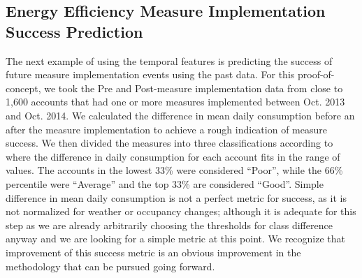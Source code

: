 \subsection{Energy Efficiency Measure Implementation Success Prediction}
\label{sec:measuresuccess}

The next example of using the temporal features is predicting the success of future measure implementation events using the past data. For this proof-of-concept, we took the Pre and Post-measure implementation data from close to 1,600 accounts that had one or more measures implemented between Oct. 2013 and Oct. 2014. We calculated the difference in mean daily consumption before an after the measure implementation to achieve a rough indication of measure success. We then divided the measures into three classifications according to where the difference in daily consumption for each account fits in the range of values. The accounts in the lowest 33\% were considered “Poor”, while the 66\% percentile were “Average” and the top 33\% are considered “Good”. Simple difference in mean daily consumption is not a perfect metric for success, as it is not normalized for weather or occupancy changes; although it is adequate for this step as we are already arbitrarily choosing the thresholds for class difference anyway and we are looking for a simple metric at this point. We recognize that improvement of this success metric is an obvious improvement in the methodology that can be pursued going forward.